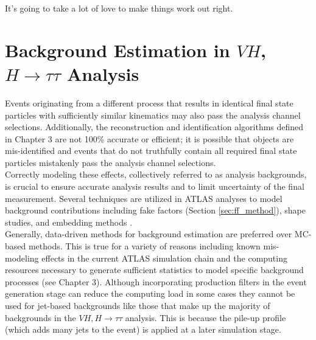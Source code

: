 \begin{savequote}[75mm]
It's going to take a lot of love to make things work out right.
\end{savequote}

\chapter{Background Estimation in $VH$, $H\rightarrow \tau\tau$ Analysis}

 Events originating from a different process that results in identical final state particles with sufficiently similar kinematics may also pass the analysis channel selections. Additionally, the reconstruction and identification algorithms defined in Chapter 3 are not 100\% accurate or efficient; it is possible that objects are mis-identified and events that do not truthfully contain all required final state particles mistakenly pass the analysis channel selections.\\

Correctly modeling these effects, collectively referred to as analysis backgrounds, is crucial to ensure accurate analysis results and to limit uncertainty of the final measurement. Several techniques are utilized in ATLAS analyses to model background contributions including fake factors (Section \ref{sec:ff_method}), shape studies, and embedding methods \cite{datadriven_bkg}.\\

Generally, data-driven methods for background estimation are preferred over MC-based methods. This is true for a variety of reasons including known mis-modeling effects in the current ATLAS simulation chain and the computing resources necessary to generate sufficient statistics to model specific background processes (see Chapter 3). Although incorporating production filters in the event generation stage can reduce the computing load in some cases they cannot be used for jet-based backgrounds like those that make up the majority of backgrounds in the $VH,H\rightarrow\tau\tau$ analysis. This is because the pile-up profile (which adds many jets to the event) is applied at a later simulation stage.\\

